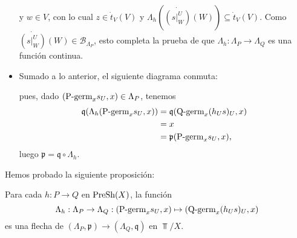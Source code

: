 \begin{itemize}
$$      $$
      y $w\in V$, con lo cual $z\in\dot{t}_{V}(V)$ y $\Lambda_h(\dot{(s|^{U}_{W})}(W))\subseteq \dot{t}_{V}(V)$. Como $\dot{(s|^{U}_{W})}(W)\in\mathcal{B}_{\Lambda_P}$, esto completa la prueba de que $\Lambda_h:\Lambda_P\to \Lambda_Q$ es una función continua.
   \item Sumado a lo anterior, el siguiente diagrama conmuta:
      
      pues, dado $(\normalfont{\text{P-germ}}_{x}s_{U},x)\in \Lambda_P$, tenemos
      $$
      \begin{aligned}
         \mathfrak{q}(\Lambda_h(\normalfont{\text{P-germ}}_{x}s_{U},x))&=\mathfrak{q}(\normalfont{\text{Q-germ}}_{x}(h_{U}s)_{U},x)\\
                                                   &=x\\
                                                   &=\mathfrak{p}(\normalfont{\text{P-germ}}_{x}s_{U},x),
      \end{aligned}
      $$
      luego $\mathfrak{p}=\mathfrak{q}\circ\Lambda_h$.
\end{itemize}
Hemos probado la siguiente proposición:
\begin{Prop}
   Para cada $h:P\to Q$ en $\normalfont{\text{PreSh}}(X)$, la función 
   $$
      \Lambda_h:\Lambda_P\to \Lambda_Q:(\normalfont{\text{P-germ}}_{x}s_{U},x)\mapsto (\normalfont{\text{Q-germ}}_{x}(h_{U}s)_{U},x)
   $$
   es una flecha de $(\Lambda_P,\mathfrak{p})\to(\Lambda_Q,\mathfrak{q})$ en $\Top/X$.
\end{Prop}


